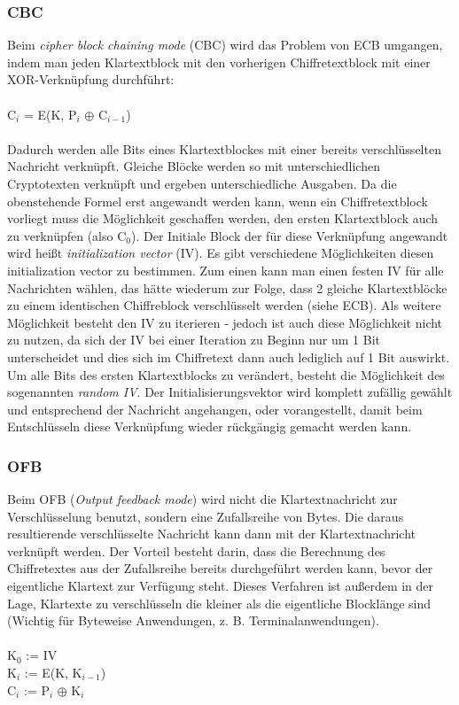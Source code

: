 \documentclass[10pt, a4paper,headsepline]{scrreprt}
\begin{document}
\subsubsection{CBC}
Beim \textit{cipher block chaining mode} (CBC) wird das Problem von ECB umgangen, indem man jeden Klartextblock mit den vorherigen Chiffretextblock mit einer XOR-Verknüpfung durchführt: \\ \\
C$_{i}$ = E(K, P$_{i}$ $\oplus$ C$_{i-1}$) \\ \\
Dadurch werden alle Bits eines Klartextblockes mit einer bereits verschlüsselten Nachricht verknüpft. Gleiche Blöcke werden so mit unterschiedlichen Cryptotexten verknüpft und ergeben unterschiedliche Ausgaben.
Da die obenstehende Formel erst angewandt werden kann, wenn ein Chiffretextblock vorliegt muss die Möglichkeit geschaffen werden, den ersten Klartextblock auch zu verknüpfen (also C$_{0}$). Der Initiale Block der für diese Verknüpfung angewandt wird heißt \textit{initialization vector} (IV).
Es gibt verschiedene Möglichkeiten diesen initialization vector zu bestimmen. Zum einen kann man einen festen IV für alle Nachrichten wählen, das hätte wiederum zur Folge, dass 2 gleiche Klartextblöcke zu einem identischen Chiffreblock verschlüsselt werden (siehe ECB). Als weitere Möglichkeit besteht den IV zu iterieren - jedoch ist auch diese Möglichkeit nicht zu nutzen, da sich der IV bei einer Iteration zu Beginn nur um 1 Bit unterscheidet und dies sich im Chiffretext dann auch lediglich auf 1 Bit auswirkt. Um alle Bits des ersten Klartextblocks zu verändert, besteht die Möglichkeit des sogenannten \textit{random IV}. Der Initialisierungsvektor wird komplett zufällig gewählt und entsprechend der Nachricht angehangen, oder vorangestellt, damit beim Entschlüsseln diese Verknüpfung wieder rückgängig gemacht werden kann. \citep[S. 227ff]{book:angewandte-krypto}

\subsubsection{OFB}
Beim OFB (\textit{Output feedback mode}) wird nicht die Klartextnachricht zur Verschlüsselung benutzt, sondern eine Zufallsreihe von Bytes. Die daraus resultierende verschlüsselte Nachricht kann dann mit der Klartextnachricht verknüpft werden. Der Vorteil besteht darin, dass die Berechnung des Chiffretextes aus der Zufallsreihe bereits durchgeführt werden kann, bevor der eigentliche Klartext zur Verfügung steht. Dieses Verfahren ist außerdem in der Lage, Klartexte zu verschlüsseln die kleiner als die eigentliche Blocklänge sind (Wichtig für Byteweise Anwendungen, z. B. Terminalanwendungen). \citep[S. 240ff]{book:angewandte-krypto} \\ \\
K$_{0}$ := IV \\
K$_{i}$ := E(K, K$_{i-1}$) \\
C$_{i}$ := P$_{i}$ $\oplus$ K$_{i}$ \\ \\
\end{document}
